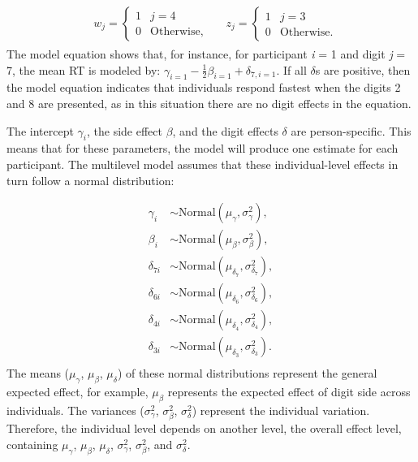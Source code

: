 \documentclass[
  english,
  doc,floatsintext]{apa6}
\begin{document}
\begin{align*}
&
\begin{aligned}
w_j = 
\begin{cases}
1 & j = 4\\
0 & \text{Otherwise},
\end{cases}
\end{aligned}
&
\begin{aligned}
z_j = 
\begin{cases}
1 & j = 3\\
0 & \text{Otherwise}.
\end{cases}
\end{aligned}
\end{align*}
The model equation shows that, for instance, for participant \emph{i} = 1 and digit \emph{j} = 7, the mean RT is modeled by: \(\gamma_{i = 1} - \frac{1}{2} \beta_{i = 1} + \delta_{7,i = 1}\). If all \(\delta\)s are positive, then the model equation indicates that individuals respond fastest when the digits 2 and 8 are presented, as in this situation there are no digit effects in the equation.

The intercept \(\gamma_i\), the side effect \(\beta\), and the digit effects \(\delta\) are person-specific. This means that for these parameters, the model will produce one estimate for each participant. The multilevel model assumes that these individual-level effects in turn follow a normal distribution:

\begin{equation}
\begin{aligned}
\gamma_{i} &\sim \text{Normal}(\mu_{\gamma}, \sigma^2_{\gamma}), \label{eq:fixedvsrandom}\\
\beta_{i} &\sim \text{Normal}(\mu_{\beta}, \sigma^2_{\beta}), \\
\delta_{7i} &\sim \text{Normal}(\mu_{\delta_{7}}, \sigma^2_{\delta_{7}}), \\
\delta_{6i} &\sim \text{Normal}(\mu_{\delta_{6}}, \sigma^2_{\delta_{6}}), \\
\delta_{4i} &\sim \text{Normal}(\mu_{\delta_{4}}, \sigma^2_{\delta_{4}}),\\
\delta_{3i} &\sim \text{Normal}(\mu_{\delta_{3}}, \sigma^2_{\delta_{3}}).\\
\end{aligned}
\end{equation}
The means (\(\mu_{\gamma}\), \(\mu_{\beta}\), \(\mu_{\delta}\)) of these normal distributions represent the general expected effect, for example, \(\mu_{\beta}\) represents the expected effect of digit side across individuals. The variances (\(\sigma^2_{\gamma}\), \(\sigma^2_{\beta}\), \(\sigma^2_{\delta}\)) represent the individual variation. Therefore, the individual level depends on another level, the overall effect level, containing \(\mu_{\gamma}\), \(\mu_{\beta}\), \(\mu_{\delta}\), \(\sigma^2_{\gamma}\), \(\sigma^2_{\beta}\), and \(\sigma^2_{\delta}\).
\end{document}
